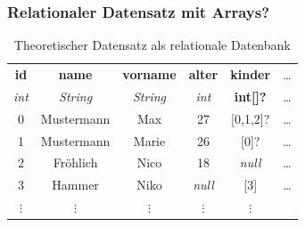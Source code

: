 \begin{frame}
    \frametitle{Relationaler Datensatz mit Arrays?}

    \begin{table}
        \centering
        \begin{adjustbox}{width=\textwidth}
            \small
            \begin{tabular}[c]{|c|c|c|c|c|c}

                \hline

                \multicolumn{1}{|c|}{\textbf{id}} &
                \multicolumn{1}{c|}{\textbf{name}} &
                \multicolumn{1}{c|}{\textbf{vorname}} &
                \multicolumn{1}{c|}{\textbf{alter}} &
                \multicolumn{1}{c|}{\textbf{kinder}} &
                \multicolumn{1}{c}{\dots} \\

                \multicolumn{1}{|c|}{\textit{int}} &
                \multicolumn{1}{c|}{\textit{String}} &
                \multicolumn{1}{c|}{\textit{String}} &
                \multicolumn{1}{c|}{\textit{int}} &
                \multicolumn{1}{c|}{\textbf{int[]?}} &
                \multicolumn{1}{c}{\dots} \\

                \hline

                0  & Mustermann  & Max    & 27            & [0,1,2]?       & \dots \\
                1  & Mustermann  & Marie  & 26            & [0]?           & \dots \\
                2  & Fröhlich    & Nico   & 18            & \textit{null}  & \dots \\
                3  & Hammer      & Niko   & \textit{null} & [3]            & \dots \\
                $\vdots$ & $\vdots$ & $\vdots$ & $\vdots$ & $\vdots$ &

            \end{tabular}
        \end{adjustbox}
        \caption{Theoretischer Datensatz  als relationale Datenbank}
        \label{tab:erwachsene2}
    \end{table}

\end{frame}


